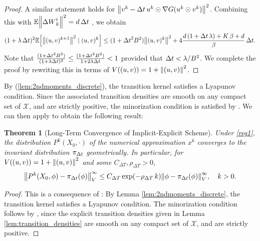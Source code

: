 \documentclass[11pt, twoside]{report}
\newtheorem{theorem}{Theorem}[section]
\begin{document}
\begin{proof}
   A similar statement holds for $\left\lVert v^k-{\Delta t}\, u^k \odot \nabla G(u^k \odot v^k)\right\rVert^2$.
    Combining this with $ \EE\norm{ \deltaw^i_k}^2= d\,\Delta t$ , we obtain  
    \begin{align*}
    (1+\lambda \,\deltat)^2 \EE\Bigl[\norm{(u,v)^{k+1}}^2 \mid (u,v)^k\Bigr] \leq (1+\deltat^2 \cinfty^2)\norm{(u,v)^{k}}^2  + 
    4{ \frac{d\,( 1 + \deltat \,\lambda) + \ccc\,\beta + d}{\beta}}\,\deltat.
    \end{align*}
    Note that
    $
    \frac{(1+{\Delta t}^2 B^2)}{(1+\lambda {\Delta t})^2} \leq \frac{(1+{\Delta t}^2 B^2)}{1+2\lambda {\Delta t}} <1
    $
    provided that ${\Delta t}  < \lambda/B^2 $. We complete the proof by rewriting this in terms of $V((u,v))=1+\left\lVert(u,v)\right\rVert^2$.
\end{proof}

By  (\ref{lem:2ndmoments_discrete}), the transition kernel satisfies a Lyapunov condition. Since the associated transition densities are smooth on any compact set of $\mathcal X$, and are strictly positive, the minorization condition is satisfied by \cite[Lemma 2.3]{mattingly2002ergodicity}. We can then apply \cite[Theorem 2.25]{Lelievre2016-hx} to obtain the following result:
\begin{theorem}[Long-Term Convergence of Implicit-Explicit Scheme]
\label{num_erg} Under \ref{reg1}, the distribution $P^k(X_0,\cdot)$ of the numerical approximation $x^k$  converges to the invariant distribution $\pi_{{\Delta t}}$ geometrically. In particular, for $V((u,v))=1+\left\lVert(u,v)\right\rVert^2$ and some $C_{\Delta T},\rho_{\Delta T}>0$,
    \[\norm{ P^k(X_0,\phi )  - \pi_{\deltat}(\phi)}^\infty_V\le  C_{\Delta T} \exp(-\rho_{\Delta T}\, k) \norm{\phi-\pi_\tstep(\phi)}^\infty_V,\quad k>0.
    \]
\end{theorem}

\begin{proof}
    This is a consequence of \cite[Theorem 2.25]{Lelievre2016-hx}: By  Lemma \ref{lem:2ndmoments_discrete}, the transition kernel satisfies a Lyapunov condition. The minorization condition  follows by \cite[Lemma 2.3]{mattingly2002ergodicity}, since  the  explicit transition densities given in Lemma \ref{lem:transition_densities} are smooth on any compact set of $\mathcal X$, and are strictly positive.
\end{proof}
\end{document}

